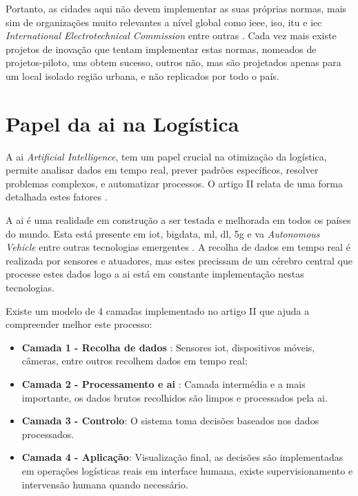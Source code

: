 Portanto, as cidades aqui não devem implementar as suas próprias normas, mais sim de organizações muito relevantes a nível global como \gls{ieee}, \gls{iso}, \gls{itu} e \gls{iec} \textit{International Electrotechnical Commission}  entre outras \cite{article}.
Cada vez mais existe projetos de inovação que tentam implementar estas normas, nomeados de projetos-piloto, uns obtem sucesso, outros não, mas são projetados apenas para um local isolado região urbana, e não replicados por todo o país. 

\section{Papel da \gls{ai} na Logística}
\label{sec:papel_ai_logistica}
A \gls{ai} \textit{Artificial Intelligence}, tem um papel crucial na otimização da logística, permite analisar dados em tempo real, prever padrões específicos, resolver problemas complexos, e automatizar processos. O artigo II relata de uma forma detalhada estes fatores \cite{su162411265}.

A \gls{ai} é uma realidade em construção a ser testada e melhorada em todos os países do mundo. Esta está presente em \gls{iot}, \gls{bigdata}, \gls{ml}, \gls{dl}, \gls{5g} e \gls{va} \textit{Autonomous Vehicle} entre outras tecnologias emergentes \cite{su162411265}.
A recolha de dados em tempo real é realizada por sensores  e atuadores, mas estes precissam de um cérebro central que processe estes dados logo a \gls{ai} está em constante implementação nestas tecnologias.

Existe um modelo de 4 camadas implementado no artigo II  que ajuda a compreender melhor este processo\cite{su162411265}:
\begin{itemize}
    \item \textbf{Camada 1 - Recolha de dados }: Sensores \gls{iot}, dispositivos móveis, câmeras, entre outros recolhem dados em tempo real;
    \item \textbf{Camada 2 - Processamento e \gls{ai} }:  Camada intermédia e a mais importante, os dados brutos recolhidos são limpos e processados pela \gls{ai}.
    \item \textbf{Camada 3 - Controlo}: O sistema toma decisões baseados nos dados processados. 
    \item \textbf{Camada 4 - Aplicação}: Visualização final, as decisões são implementadas em operações logísticas reais em interface humana, existe supervisionamento e intervensão humana quando necessário.
\end{itemize}

